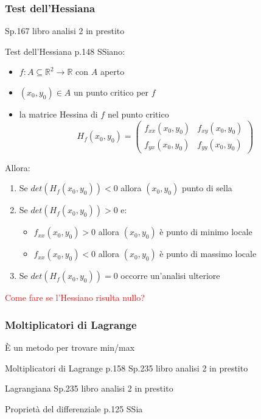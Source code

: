 \documentclass{article}  %
\begin{document}
\subsubsection{Test dell'Hessiana}
Sp.167 libro analisi 2 in prestito
\begin{theorem}{Test dell'Hessiana p.148}
	SSiano:
	\begin{itemize}
		\item $f:A \subseteq \mathbb{R}^2 \to \mathbb{R}$ con $A$ aperto
		\item $(x_0,y_0) \in A$ un punto critico per $f$
		\item la matrice Hessina di $f$ nel punto critico
		      \[
			      H_f(x_0, y_0) = \begin{pmatrix}
				      f_{xx}(x_0,y_0) & f_{xy}(x_0,y_0) \\
				      f_{yx}(x_0,y_0) & f_{yy}(x_0,y_0)
			      \end{pmatrix}
		      \]
	\end{itemize}
	Allora:
	\begin{enumerate}
		\item Se $det(H_f(x_0, y_0)) < 0$ allora $(x_0,y_0)$ punto di sella
		\item Se $det(H_f(x_0, y_0)) > 0$ e:
		      \begin{itemize}
			      \item $f_{xx}(x_0,y_0) > 0$ allora $(x_0,y_0)$ è punto di minimo locale
			      \item $f_{xx}(x_0,y_0) < 0$ allora $(x_0,y_0)$ è punto di massimo locale
		      \end{itemize}
		\item Se $det(H_f(x_0, y_0)) = 0$ occorre un'analisi ulteriore
	\end{enumerate}
	\textcolor{red}{Come fare se l'Hessiano risulta nullo?}
\end{theorem}
\subsubsection{Moltiplicatori di Lagrange}
È un metodo per trovare min/max
\begin{theorem}{Moltiplicatori di Lagrange p.158}
	Sp.235 libro analisi 2 in prestito
\end{theorem}
\begin{definition}{Lagrangiana}
	Sp.235 libro analisi 2 in prestito
\end{definition}
\begin{theorem}{Proprietà del differenziale p.125}
	SSia
\end{theorem}
\break
\end{document}
